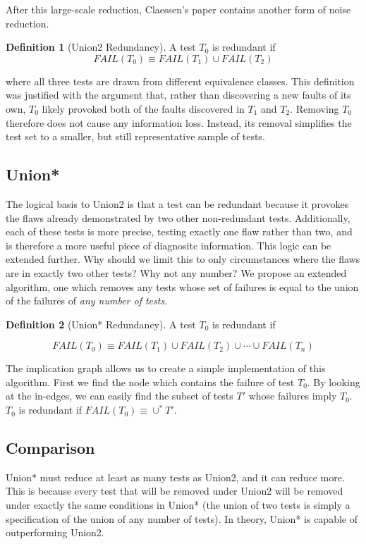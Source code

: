 \documentclass[11pt,twoside]{article}
\newcommand\fail{\mathit{FAIL}}
\theoremstyle{definition}
\newtheorem{defn}{Definition}
\let\cite=\citep
\begin{document}
After this large-scale reduction, Claessen's paper contains another form of noise reduction. 

\begin{defn}[Union2 Redundancy]
A test $T_0$ is redundant if
$$\fail (T_0) \equiv \fail(T_1) \cup \fail(T_2)$$
\end{defn}
where all three tests are drawn from different equivalence classes. This definition was justified with the argument that, rather than discovering a new faults of its own, $T_0$ likely provoked both of the faults discovered in $T_1$ and $T_2$. Removing $T_0$ therefore does not cause any information loss. Instead, its removal simplifies the test set to a smaller, but still representative sample of tests.

\subsection{Union*}
The logical basis to Union2 is that a test can be redundant because it provokes the flaws already demonstrated by two other non-redundant tests\cite{Claessen}. Additionally, each of these tests is more precise, testing exactly one flaw rather than two, and is therefore a more useful piece of diagnositc information. This logic can be extended further. Why should we limit this to only circumstances where the flaws are in exactly two other tests? Why not any number? We propose an extended algorithm, one which removes any tests whose set of failures is equal to the union of the failures of \emph{any number of tests}. 

\begin{defn}[Union* Redundancy]
A test $T_0$ is redundant if

$$\fail (T_0) \equiv \fail(T_1) \cup \fail(T_2) \cup \cdots \cup \fail(T_n) $$
\end{defn}

The implication graph allows us to create a simple implementation of this algorithm. First we find the node which contains the failure of test $T_0$. By looking at the in-edges, we can easily find the subset of tests $T'$ whose failures imply $T_0$. $T_0$ is redundant if \mbox{$\fail(T_0) \equiv \cup^* T'$}.

\subsection{Comparison}
Union* must reduce at least as many tests as Union2, and it can reduce more. This is because every test that will be removed under Union2 will be removed under exactly the same conditions in Union* (the union of two tests is simply a specification of the union of any number of tests). In theory, Union* is capable of outperforming Union2.
\end{document}
